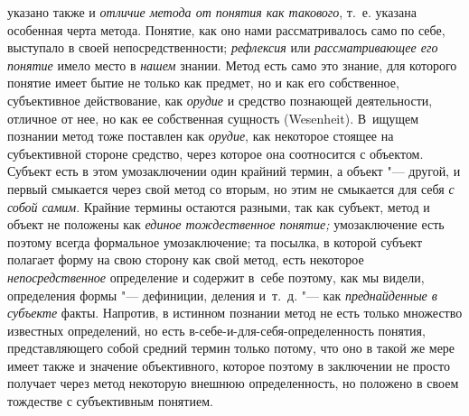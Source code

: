 указано также и {\em отличие метода от понятия как
такового}, т.~е. указана особенная черта метода. Понятие,
как оно нами рассматривалось само по себе, выступало в своей
непосредственности; {\em рефлексия} или {\em рассматривающее
его понятие }имело место в {\em нашем} знании. Метод
есть само это знание, для которого понятие имеет бытие не только как
предмет, но и как его собственное, субъективное действование, как
{\em орудие} и средство
познающей деятельности, отличное от нее, но как ее собственная сущность
(Wesenheit). В~ищущем познании метод тоже поставлен как {\em орудие}, как
некоторое стоящее на субъективной стороне средство, через которое она
соотносится с объектом. Субъект есть в этом умозаключении один крайний
термин, а объект "--- другой, и первый смыкается через свой
метод со вторым, но этим не смыкается для себя {\em с собой самим}.
Крайние термины остаются разными, так как субъект, метод и
объект не положены как {\em единое
тождественное понятие;} умозаключение есть поэтому всегда
формальное умозаключение; та посылка, в которой субъект полагает форму на
свою сторону как свой метод, есть некоторое {\em непосредственное}
определение и содержит в~себе поэтому, как мы видели, определения
формы "--- дефиниции, деления и~т.~д. "--- как {\em преднайденные в
субъекте} факты. Напротив, в истинном познании метод не есть
только множество известных определений, но есть
в-себе-и-для-себя-определенность понятия, представляющего собой средний
термин только потому, что оно в такой же мере имеет также и значение
объективного, которое поэтому в заключении не просто получает через метод
некоторую внешнюю определенность, но положено в своем тождестве с
субъективным понятием.

